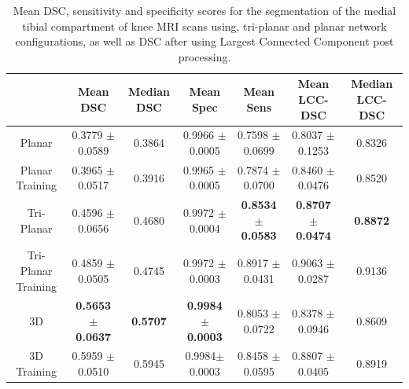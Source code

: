 \documentclass[11pt,a4paper]{memoir}
\numberwithin{figure}{section}
\numberwithin{table}{section}
\numberwithin{equation}{section}
\begin{document}
\begin{landscape}
\begin{center}

\begin{table}
\centering
	\vspace{4cm}
   \caption[Results of MRI segmentation for all network architectures used]{Mean DSC, sensitivity and specificity scores for the segmentation of the medial tibial compartment of knee MRI scans using, tri-planar and planar network configurations, as well as DSC after using Largest Connected Component post processing. }
\begin{tabular}{|c|c|c|c|c|c|c|}

\hline

           & Mean DSC            & Median DSC & Mean Spec           & Mean Sens           & Mean LCC-DSC        & Median LCC-DSC \\ \hline
Planar     & 0.3779 $\pm$  0.0589 & 0.3864     & 0.9966 $\pm$ 0.0005 & 0.7598 $\pm$ 0.0699 & 0.8037 $\pm$ 0.1253 & 0.8326         \\ \hline
Planar Training & 0.3965 $\pm$ 0.0517	& 0.3916  &	 0.9965 $\pm$ 0.0005	& 0.7874 $\pm$ 0.0700 &	0.8460 $\pm$ 0.0476 	  &	             0.8520		 	  \\ \hline
Tri-Planar & 0.4596 $\pm$ 0.0656 & 0.4680     & 0.9972 $\pm$ 0.0004 & \textbf{0.8534 $\pm$ 0.0583} & \textbf{0.8707 $\pm$ 0.0474} & \textbf{0.8872}         \\ \hline
Tri-Planar Training & 0.4859 $\pm$ 0.0505	& 0.4745  &	 0.9972 $\pm$ 0.0003	& 0.8917 $\pm$ 0.0431 &	0.9063 $\pm$ 0.0287 	  &	             0.9136		 	  \\ \hline


3D         & \textbf{0.5653 $\pm$ 0.0637} & \textbf{0.5707}     & \textbf{0.9984 $\pm$ 0.0003} & 0.8053 $\pm$ 0.0722 & 0.8378 $\pm$ 0.0946 & 0.8609         \\ \hline
3D Training &	 0.5959	$\pm$ 0.0510	&	 0.5945		&			  0.9984$\pm$ 0.0003	&		 0.8458	$\pm$0.0595		&				0.8807 $\pm$ 0.0405
		&	 0.8919
			\\ \hline

\end{tabular}

\label{table:Dice}

\end{table}
\end{center}
\end{landscape}
\end{document}
